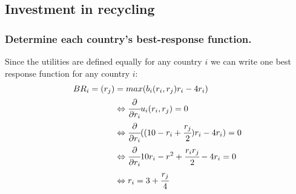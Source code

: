 \subsection{Investment in recycling}

    \subsubsection{Determine each country's best-response function.}
    Since the utilities are defined equally for any country $i$ we can write one best response function for any country $i$:
    \begin{equation}
        \begin{split}
            BR_i=(r_j)&=max(b_i(r_i,r_j)r_i-4r_i)\\
            &\Leftrightarrow \cfrac{\partial}{\partial r_i}u_i(r_i,r_j)=0\\
            &\Leftrightarrow \cfrac{\partial}{\partial r_i}((10-r_i+\cfrac{r_j}{2})r_i-4r_i)=0\\
            &\Leftrightarrow \cfrac{\partial}{\partial r_i}10r_i-r^2+\cfrac{r_ir_j}{2}-4r_i=0\\
            &\Leftrightarrow r_i = 3+\cfrac{r_j}{4}
        \end{split}
    \end{equation}


